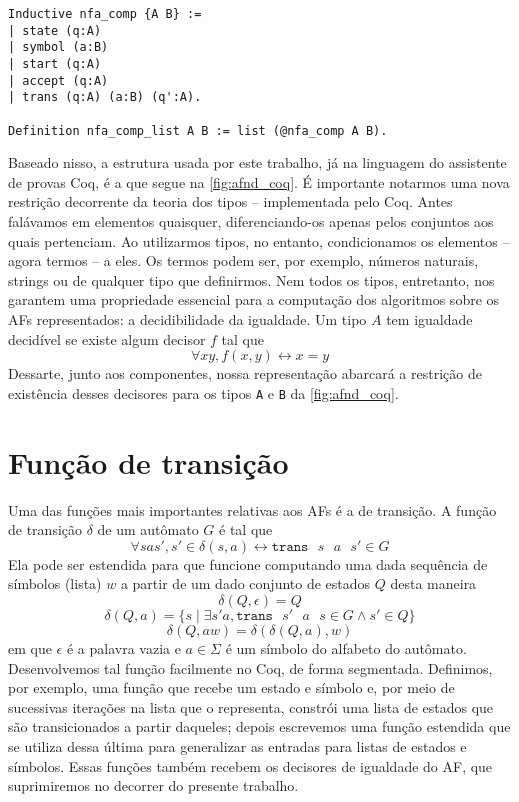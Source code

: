 
\begin{verbatim}
Inductive nfa_comp {A B} :=
| state (q:A)
| symbol (a:B)
| start (q:A)
| accept (q:A)
| trans (q:A) (a:B) (q':A).

Definition nfa_comp_list A B := list (@nfa_comp A B).
\end{verbatim}

Baseado nisso, a estrutura usada por este trabalho, já na linguagem do assistente de provas Coq, é a que segue na \autoref{fig:afnd_coq}. É importante notarmos uma nova restrição decorrente da teoria dos tipos -- implementada pelo Coq. Antes falávamos em elementos quaisquer, diferenciando-os apenas pelos conjuntos aos quais pertenciam. Ao utilizarmos tipos, no entanto, condicionamos os elementos -- agora termos -- a eles. Os termos podem ser, por exemplo, números naturais, strings ou de qualquer tipo que definirmos. Nem todos os tipos, entretanto, nos garantem uma propriedade essencial para a computação dos algoritmos sobre os AFs representados: a decidibilidade da igualdade. Um tipo $A$ tem igualdade decidível se existe algum decisor $f$ tal que $$\forall x y, f(x, y) \leftrightarrow x = y$$ Dessarte, junto aos componentes, nossa representação abarcará a restrição de existência desses decisores para os tipos \texttt{A} e \texttt{B} da \autoref{fig:afnd_coq}.

\section{Função de transição}

Uma das funções mais importantes relativas aos AFs é a de transição. A função de transição $\delta$ de um autômato $G$ é tal que $$\forall s a s', s' \in \delta(s, a) \leftrightarrow \texttt{trans}\text{ }s\text{ }a\text{ }s' \in G$$ Ela pode ser estendida para que funcione computando uma dada sequência de símbolos (lista) $w$ a partir de um dado conjunto de estados $Q$ desta maneira $$\delta(Q, \epsilon) = Q$$ $$\delta(Q, a) = \{ s \mid \exists s' a, \texttt{trans}\text{ }s'\text{ }a\text{ }s \in G \wedge s' \in Q \}$$ $$\delta(Q, aw) = \delta(\delta(Q, a), w)$$ em que $\epsilon$ é a palavra vazia e $a \in \Sigma$ é um símbolo do alfabeto do autômato. Desenvolvemos tal função facilmente no Coq, de forma segmentada. Definimos, por exemplo, uma função que recebe um estado e símbolo e, por meio de sucessivas iterações na lista que o representa, constrói uma lista de estados que são transicionados a partir daqueles; depois escrevemos uma função estendida que se utiliza dessa última para generalizar as entradas para listas de estados e símbolos. Essas funções também recebem os decisores de igualdade do AF, que suprimiremos no decorrer do presente trabalho. 

